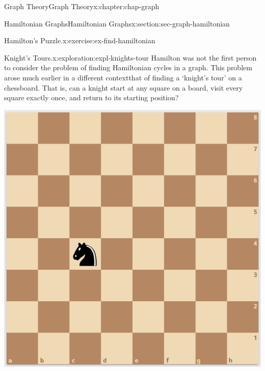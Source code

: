 \documentclass[oneside,10pt,]{book}
\numberwithin{equation}{section}
\begin{document}
\begin{chapterptx}{Graph Theory}{}{Graph Theory}{}{}{x:chapter:chap-graph}
\begin{sectionptx}{Hamiltonian Graphs}{}{Hamiltonian Graphs}{}{}{x:section:sec-graph-hamiltonian}
\begin{inlineexercise}{Hamilton's Puzzle.}{x:exercise:ex-find-hamiltonian}
\begin{sidebyside}{1}{0.375}{0.375}{0}
\begin{sbspanel}{0.25}
{
}%
\end{sbspanel}%
\end{sidebyside}%
\end{inlineexercise}%
\begin{exploration}{Knight's Tours.}{x:exploration:expl-knights-tour}%
Hamilton was not the first person to consider the problem of finding Hamiltonian cycles in a graph. This problem arose much earlier in a different context\textemdash{}that of finding a `knight's tour' on a chessboard. That is, can a knight start at any square on a board, visit every square exactly once, and return to its starting position?%
\begin{sidebyside}{1}{0.275}{0.275}{0}%
\begin{sbspanel}{0.45}%
\includegraphics[width=\linewidth]{images/knight.PNG}

\end{sbspanel}
\end{sidebyside}
\end{exploration}
\end{sectionptx}
\end{chapterptx}
\end{document}
